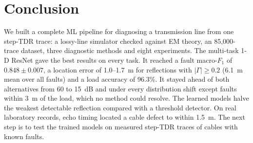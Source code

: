 \section{Conclusion}
We built a complete ML pipeline for diagnosing a transmission line from one step-TDR trace: a lossy-line simulator checked against EM theory, an 85,000-trace dataset, three diagnostic methods and eight experiments. The multi-task 1-D ResNet gave the best results on every task. It reached a fault macro-$F_1$ of $0.848 \pm 0.007$, a location error of 1.0--1.7~m for reflections with $|\Gamma| \ge 0.2$ (6.1~m mean over all faults) and a load accuracy of 96.3\%. It stayed ahead of both alternatives from 60 to 15~dB and under every distribution shift except faults within 3~m of the load, which no method could resolve. The learned models halve the weakest detectable reflection compared with a threshold detector. On real laboratory records, echo timing located a cable defect to within 1.5~m. The next step is to test the trained models on measured step-TDR traces of cables with known faults.
